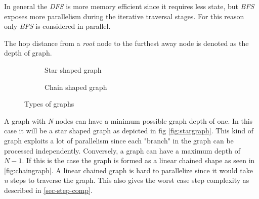 \noindent In general the \textit{DFS} is more memory efficient since it requires less state, but \textit{BFS} exposes more parallelism during the iterative traversal stages.
For this reason only \textit{BFS} is considered in parallel.

The hop distance from a \textit{root} node to the furthest away node is denoted as the depth of graph.
\begin{figure}[ht]
	\begin{subfigure}{0.5\textwidth}
		\begin{center}
		\end{center}
		\caption{Star shaped graph}
		\label{fig:stargraph}
	\end{subfigure}%
	\begin{subfigure}{0.5\textwidth}
		\begin{center}
		\end{center}
		\caption{Chain shaped graph}
		\label{fig:chaingraph}
	\end{subfigure}
	\caption{Types of graphs}
\end{figure}
A graph with \textit{N} nodes can have a minimum possible graph depth of one.
In this case it will be a star shaped graph as depicted in fig \autoref{fig:stargraph}.
This kind of graph exploits a lot of parallelism since each "branch" in the graph can be processed independently.
Conversely, a graph can have a maximum depth of $N-1$.
If this is the case the graph is formed as a linear chained shape as seen in \autoref{fig:chaingraph}.
A linear chained graph is hard to parallelize since it would take \textit{n} steps to traverse the graph.
This also gives the worst case step complexity as described in \autoref{sec-step-comp}.
\\\\
